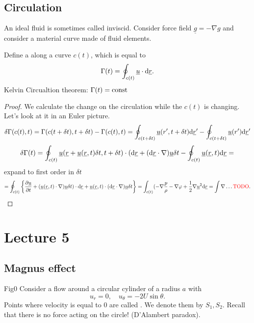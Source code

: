 \documentclass[11pt,oneside]{book}
\renewcommand{\vec}[1]{\underline{#1}}
\theoremstyle{definition} %
\theoremstyle{plain} %
\theoremstyle{remark} %
\theoremstyle{underline}
\begin{document}
  \section{Circulation}
  An ideal fluid is sometimes called inviscid.
  Consider force field $\vec g = - \nabla g$ and consider a material curve made of fluid elements.

  Define a   along a curve $c(t)$, which is equal to 
  \begin{displaymath}
    \Gamma(t) = \oint_{c(t)} \vec u \cdot \d \vec r.
  \end{displaymath}
  Kelvin Circualtion theorem: $\Gamma(t) = \textrm{const}$

  \begin{proof}
    
    We calculate the change on the circulation while the $c(t)$ is changing.
    Let's look at it in an Euler picture.
    \begin{displaymath}
      \delta \Gamma(c(t),t) = \Gamma(c(t + \delta t), t + \delta t) - \Gamma(c(t), t) 
      = \oint_{c(t + \delta t)} \vec u( r', t + \delta t) \d \vec r' 
      - \oint_{c(t + \delta t)} \vec u( r') \d \vec r' 
    \end{displaymath}
    \begin{displaymath}
      \delta \Gamma(t) = \oint_{c(t)} \vec u( \vec r + \vec u(\vec r, t) \delta t, t + \delta t) \cdot ( \d \vec r + ( \d \vec r \cdot \nabla) \vec u \delta t
      - \oint_{c(t)}\vec u(\vec r, t) \d \vec r = 
    \end{displaymath}
    expand to first order in $\delta t$
    \begin{displaymath}
      = \oint_{c(t)} \left\{ \ptf{\vec u}{t} + (\vec u(\vec r, t)\cdot \nabla ) \vec u\delta t) \cdot \d \vec r + \vec u (\vec r, t) \cdot (\d \vec r \cdot \nabla ) \vec u \delta t \right\}
      =\int_{c(t)} (- \nabla \frac{p}{\rho} - \nabla \varphi + \frac{1}{2} \nabla \vec u^2\d \vec r  = \int\nabla \dots\tm{\todo}.
    \end{displaymath}
  \end{proof}

  \chapter{Lecture 5}
  \section{Magnus effect}
  \todo Fig0
  Consider a flow around a circular cylinder of a radius $a$ with
  \begin{displaymath}
    u_r = 0, \quad u_\theta = - 2 U \sin \theta.
  \end{displaymath}
  Points where velocity is equal to $0$ are called .
  We denote them by $S_1, S_2$.
  Recall that there is no force acting on the circle! (D'Alambert paradox).
\end{document}
